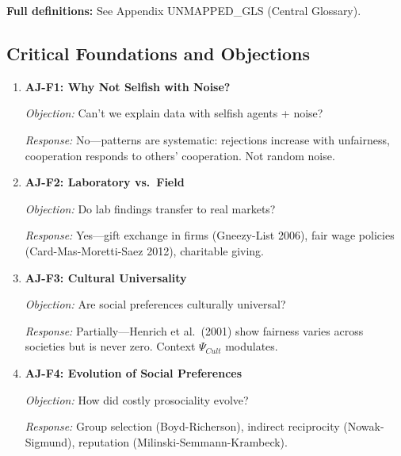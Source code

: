 \textbf{Full definitions:} See Appendix UNMAPPED_GLS (Central Glossary).

\subsection{Critical Foundations and Objections}
\label{sec:aj-foundations}


\begin{enumerate}
    \item \textbf{AJ-F1: Why Not Selfish with Noise?}

    \textit{Objection:} Can't we explain data with selfish agents + noise?

    \textit{Response:} No---patterns are systematic: rejections increase with
    unfairness, cooperation responds to others' cooperation. Not random noise.

    \item \textbf{AJ-F2: Laboratory vs.\ Field}

    \textit{Objection:} Do lab findings transfer to real markets?

    \textit{Response:} Yes---gift exchange in firms (Gneezy-List 2006), fair wage
    policies (Card-Mas-Moretti-Saez 2012), charitable giving.

    \item \textbf{AJ-F3: Cultural Universality}

    \textit{Objection:} Are social preferences culturally universal?

    \textit{Response:} Partially---Henrich et al.\ (2001) show fairness varies
    across societies but is never zero. Context $\Psi_{Cult}$ modulates.

    \item \textbf{AJ-F4: Evolution of Social Preferences}

    \textit{Objection:} How did costly prosociality evolve?

    \textit{Response:} Group selection (Boyd-Richerson), indirect reciprocity
    (Nowak-Sigmund), reputation (Milinski-Semmann-Krambeck).
\end{enumerate}


